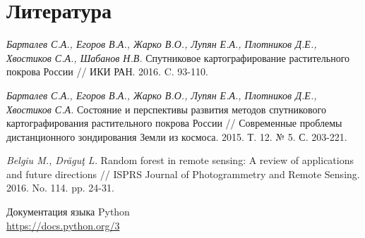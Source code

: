 \documentclass[14pt, a4paper, oneside]{extarticle}
\begin{document}
\section{Литература}
\begingroup
\renewcommand{\section}[2]{}
\begin{thebibliography}{20}
    \textit{Барталев С.А., Егоров В.А., Жарко В.О., Лупян Е.А., Плотников Д.Е., Хвостиков С.А., Шабанов Н.В.} Спутниковое картографирование растительного покрова России // ИКИ РАН. 2016. C. 93-110.

    \textit{Барталев С.А., Егоров В.А., Жарко В.О., Лупян Е.А., Плотников Д.Е., Хвостиков С.А.} Состояние и перспективы развития методов спутникового картографирования растительного покрова России // Современные проблемы дистанционного зондирования Земли из космоса. 2015. Т. 12. № 5. С. 203-221.

    \textit{Belgiu M., Drăguţ L.} Random forest in remote sensing: A review of applications and future
    directions // ISPRS Journal of Photogrammetry and Remote Sensing. 2016. No. 114. pp. 24-31.
    
    Документация языка Python\\
    \url{https://docs.python.org/3}
\end{thebibliography}
\endgroup
\newpage

\linespread{1.2}
\section{Приложения}
\newpage
\end{document}
